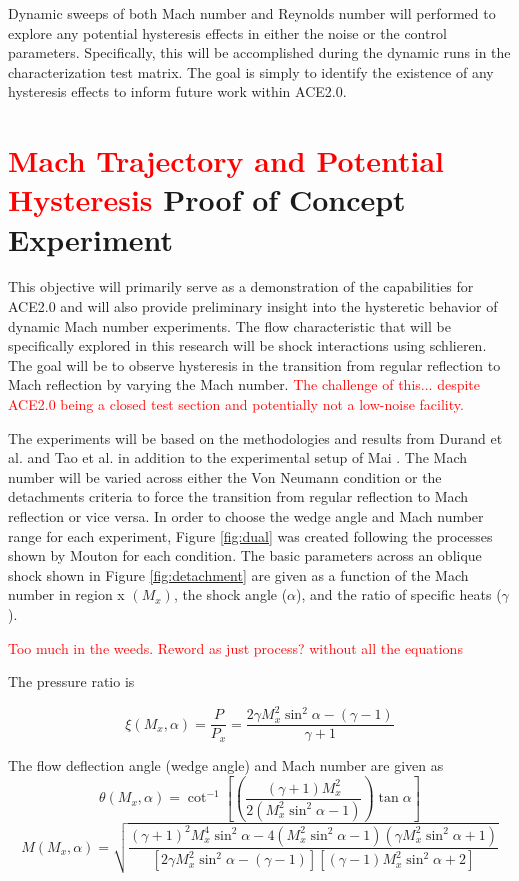 Dynamic sweeps of both Mach number and Reynolds number will performed to explore any potential hysteresis effects in either the noise or the control parameters. Specifically, this will be accomplished during the dynamic runs in the characterization test matrix. The goal is simply to identify the existence of any hysteresis effects to inform future work within ACE2.0.

\section{\textcolor{red}{Mach Trajectory and Potential Hysteresis} Proof of Concept Experiment}

This objective will primarily serve as a demonstration of the capabilities for ACE2.0 and will also provide preliminary insight into the hysteretic behavior of dynamic Mach number experiments. The flow characteristic that will be specifically explored in this research will be shock interactions using schlieren. The goal will be to observe hysteresis in the transition from regular reflection to Mach reflection by varying the Mach number. \textcolor{red}{The challenge of this... despite ACE2.0 being a closed test section and potentially not a low-noise facility. }

The experiments will be based on the methodologies and results from Durand et al. \cite{durand} and Tao et al. \cite{tao} in addition to the experimental setup of Mai \cite{mai-dis}. The Mach number will be varied across either the Von Neumann condition or the detachments criteria to force the transition from regular reflection to Mach reflection or vice versa. In order to choose the wedge angle and Mach number range for each experiment, Figure \ref{fig:dual} was created following the processes shown by Mouton \cite{mouton} for each condition. The basic parameters across an oblique shock shown in Figure \ref{fig:detachment} are given as a function of the Mach number in region x $\left(M_x\right)$, the shock angle ($\alpha$), and the ratio of specific heats ($\gamma$). 

\textcolor{red}{Too much in the weeds. Reword as just process? without all the equations}

The pressure ratio is 

\begin{equation}
    \xi \left(M_x,\alpha\right) = \frac{P}{P_x} = \frac{2 \gamma M_x^2 \sin^2{\alpha} - (\gamma-1)}{\gamma+1}
\end{equation}

\noindent The flow deflection angle (wedge angle) and Mach number are given as
\begin{equation}
    \theta \left(M_x,\alpha\right) = \cot^{-1}{\left[ \left(\frac{(\gamma+1) M_x^2}{2\left(M_x^2 \sin^2{\alpha} - 1\right)}\right) \tan{\alpha} \right]}
\end{equation}
\begin{equation}
    M \left(M_x,\alpha\right) = \sqrt{\frac{(\gamma+1)^2 M_x^4 \sin^2{\alpha} - 4\left(M_x^2 \sin^2{\alpha} - 1\right)\left(\gamma M_x^2 \sin^2{\alpha} + 1\right)}{\left[2 \gamma M_x^2 \sin^2{\alpha} - (\gamma-1)\right]\left[(\gamma-1) M_x^2 \sin^2{\alpha} + 2\right]}}
\end{equation}

